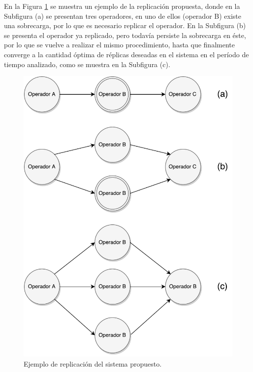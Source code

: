 En la Figura \ref{fig:ejReplicacion} se muestra un ejemplo de la replicación propuesta, donde en la Subfigura (a) se presentan tres operadores, en uno de ellos (operador B) existe una sobrecarga, por lo que es necesario replicar el operador. En la Subfigura (b) se presenta el operador ya replicado, pero todavía persiste la sobrecarga en éste, por lo que se vuelve a realizar el mismo procedimiento, hasta que finalmente converge a la cantidad óptima de réplicas deseadas en el sistema en el período de tiempo analizado, como se muestra en la Subfigura (c).

\begin{figure}[!hb]
	\centering
		\includegraphics[scale=0.6]{images/EjReplicacion.pdf}
	\caption{Ejemplo de replicación del sistema propuesto.}
	\label{fig:ejReplicacion}
\end{figure}

